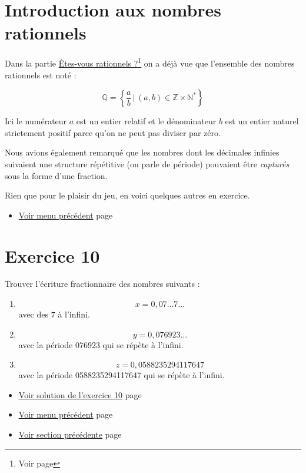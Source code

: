 \documentclass[a4paper,11pt]{book}
\begin{document}
\clearpage

\section{Introduction aux nombres rationnels}
\label{sec:orgda7fd77}
\label{org9b34a43}
\label{page:sec2.6.1intro-ratio}

Dans la partie \hyperref[orgeac9191]{Êtes-vous rationnels ?}\footnote{Voir page \pageref{page:sec2.1.4rational}}  on a déjà vue
que l'ensemble des nombres rationnels est noté :

\[\mathbb{Q} = \left\{\dfrac{a}{b}\,|\,(a,
b)\in\mathbb{Z}\times\mathbb{N}^*\right\}\]


Ici le numérateur \(a\) est un entier relatif et le
dénominateur \(b\) est un entier naturel
strictement positif parce qu'on ne peut pas diviser par zéro.

Nous avions également remarqué que les nombres dont les
décimales infinies suivaient une structure répétitive
(on parle de période) pouvaient être \emph{capturés} sous la forme d'une
fraction.


Rien que pour le plaisir du jeu, en voici quelques autres en
exercice.


\begin{itemize}
\item \hyperref[orgc112f4f]{Voir menu précédent}
page~\pageref{page:content6-menu}
\end{itemize}


\clearpage

\section{Exercice 10}
\label{sec:orgd90e4fa}
\label{org76d4ecb}
\label{page:sec2.6.2exo10}

Trouver l'écriture fractionnaire des nombres suivants :

\begin{enumerate}
\item \[x = 0,07\dots7\dots\] avec des \(7\) à l'infini.
\item \[y = 0,076923\dots\] avec la période 076923 qui se répète à
l'infini.
\item \[z = 0,0588235294117647\] avec la période 0588235294117647 qui se
répète à l'infini.
\end{enumerate}


\begin{itemize}
\item \hyperref[orgb898032]{Voir solution de l'exercice 10}
page~\pageref{page:sec8.6.1sol10}
\item \hyperref[orgc112f4f]{Voir menu précédent}
page~\pageref{page:content6-menu}
\item \hyperref[org9b34a43]{Voir section précédente}
page~\pageref{page:sec2.6.1intro-ratio}
\end{itemize}
\end{document}
